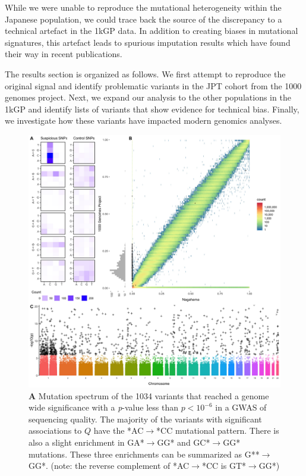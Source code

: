 \documentclass[9pt,lineno]{elife}
\begin{document}
While we were unable to reproduce the mutational heterogeneity within the Japanese population, we could trace back the source of the discrepancy to a technical artefact in the 1kGP data.
In addition to creating biases in mutational signatures, this artefact leads to spurious imputation results which have found their way in recent publications.


The results section is organized as follows.
We first attempt to reproduce the original signal and identify problematic variants in the JPT cohort from the 1000 genomes project. 
Next, we expand our analysis to the other populations in the 1kGP and identify lists of variants that show evidence for technical bias.
Finally, we investigate how these variants have impacted modern genomics analyses.  
  

\begin{figure}
\includegraphics[width=\hsize,keepaspectratio]{./Figures/Figure1.jpg}
\caption{
\textbf{A} 
Mutation spectrum of the 1034 variants that reached a genome wide significance with a \textit{p}-value less than $p < 10^{-6}$  in a GWAS of sequencing quality. 
The majority of the variants with significant associations to $Q$ have the *AC${\rightarrow}$*CC mutational pattern. There is also a slight enrichment in GA*${\rightarrow}$GG* and GC*${\rightarrow}$GG* mutations. These three enrichments can be summarized as G**${\rightarrow}$GG*. (note: the reverse complement of *AC${\rightarrow}$*CC is GT*${\rightarrow}$GG*)
}
\end{figure}
\end{document}
